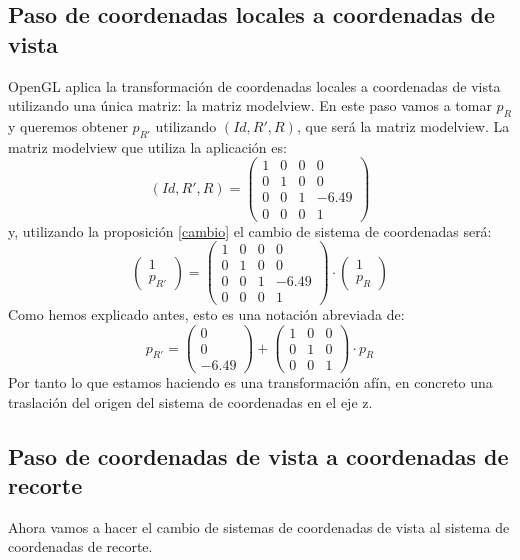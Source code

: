 \documentclass[a4paper,11pt, oneside]{book}
\begin{document}


\subsection{Paso de coordenadas locales a coordenadas de vista}

OpenGL aplica la transformación de coordenadas locales a coordenadas de vista utilizando una única matriz: la matriz modelview. En este paso vamos a tomar $p_R$ y queremos obtener $p_{R'}$ utilizando $(Id, R', R)$, que será la matriz modelview.
La matriz modelview que utiliza la aplicación es:
$$(Id, R', R) = \begin{pmatrix}
	1 & 0 & 0& 0 \\
	0 & 1&0&0 \\
	0&0&1&-6.49 \\
	0&0&0&1
\end{pmatrix}$$
y, utilizando la proposición \ref{cambio} el cambio de sistema de coordenadas será:
$$\begin{pmatrix}
	1 \\
	p_{R'}
\end{pmatrix} = \begin{pmatrix}
	1 & 0 & 0& 0 \\
	0 & 1&0&0 \\
	0&0&1&-6.49 \\
	0&0&0&1
\end{pmatrix}\cdot \begin{pmatrix}
1 \\
p_{R}
\end{pmatrix}$$
Como hemos explicado antes, esto es una notación abreviada de:
\begin{equation}
p_{R'} = 
\begin{pmatrix}
0\\
0\\
-6.49
\end{pmatrix}
+
\begin{pmatrix}
1&0&0 \\
0&1&0\\
0&0&1
\end{pmatrix}
\cdot p_R
\end{equation}
Por tanto lo que estamos haciendo es una transformación afín, en concreto una traslación del origen del sistema de coordenadas en el eje z.

\subsection{Paso de coordenadas de vista a coordenadas de recorte}
Ahora vamos a hacer el cambio de sistemas de coordenadas de vista al sistema de coordenadas de recorte.
\end{document}

